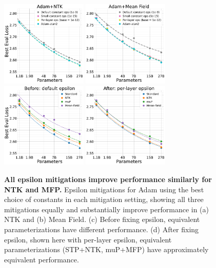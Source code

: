 \documentclass{article}
\theoremstyle{plain}
\theoremstyle{definition}
\theoremstyle{remark}
\begin{document}
\begin{figure}[ht]
    \centering
    \includegraphics[height=4.1cm]{icml2024/figures/epsilon/ntk_epsilon_eval_loss_comparisons_zoom6.pdf}
    \includegraphics[height=4.1cm]{icml2024/figures/epsilon/mfp_epsilon_eval_loss_comparisons_no_ylabel.pdf}
    \includegraphics[height=4.1cm]{icml2024/figures/epsilon/before_eps_compare_parameterizations.pdf}
    \includegraphics[height=4.1cm]{icml2024/figures/epsilon/after_eps_compare_parameterizations.pdf}
    \caption{\textbf{All epsilon mitigations improve performance similarly for NTK and MFP.} Epsilon mitigations for Adam using the best choice of constants in each mitigation setting, showing all three mitigations equally and substantially improve performance in (a) NTK and (b) Mean Field. (c) Before fixing epsilon, equivalent parameterizations have different performance. (d) After fixing epsilon, shown here with per-layer epsilon, equivalent parameterizations (STP+NTK, muP+MFP) have approximately equivalent performance.}
    \label{fig:epsilon_mitigations}
\end{figure}
\end{document}
